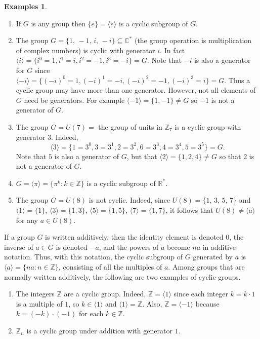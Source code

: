 \documentclass[12pt]{article}
\newcommand{\R}{\mathbb R}
\newcommand{\cm} {{\mathbb C}}
\newcommand{\Z} {{\mathbb Z}}
\newcommand{\units}[1]{\ensuremath{U(#1)}}
\newcommand{\<}{\ensuremath{\langle}}
\renewcommand{\>}{\ensuremath{\rangle}}
\newcommand{\eye}{\ensuremath{e}}
\theoremstyle{plain}
\theoremstyle{definition}
\newtheorem{exs}[thm]{Examples}
\begin{document}
\begin{exs}  \begin{enumerate}
\item If $G$ is any group  then
$\{\eye\} =\langle \eye\rangle$ is a cyclic subgroup of $G$.

\item  The group $G=\{1,\, -1,\, i,\, -i\} \subseteq \cm^*$ (the
group operation  is multiplication of complex numbers) is cyclic
with generator $i$.  In fact $\langle i\rangle = \{i^0=1, i^1=i,
i^2=-1, i^3=-i\} = G$.  Note that $-i$ is also a generator for $G$
since $\langle -i\rangle =\{(-i)^0=1, (-i)^1=-i, (-i)^2=-1,
(-i)^3=i\}=G$.  Thus a cyclic group may have more than one
generator.  However, not all elements of $G$ need be generators.
For example $\langle -1\rangle = \{1, -1\}\ne G$ so $-1$ is not a
generator of $G$.

\item The group $G=\units{7}=$ the group of units in $\Z_7$ is
a cyclic group with generator $3$.  Indeed,
$$\langle 3\rangle = \{ 1=3^0, 3=3^1, 2=3^2, 6=3^3, 4=3^4, 5=3^5\}=G.$$
Note that $5$ is also a generator of $G$, but that
$\langle 2\rangle = \{1, 2, 4\}\ne G$ so that 2 is not a generator of $G$.

\item  $G=\langle \pi\rangle =\{\pi^k:k\in \Z\}$ is a cyclic
subgroup of $\R^*$.

\item  The group $G=\units{8}$ is not cyclic.  Indeed, since
$\units{8}=\{1, \, 3,\, 5,\,7\}$ and $\langle 1\rangle = \{1\}$,
$\langle 3\rangle = \{1, 3\}$, $\langle 5\rangle=\{1, 5\}$,
$\langle 7\rangle =\{1, 7\}$, it follows that $\units{8}\ne \langle
a\rangle$ for any $a\in \units{8}$.
\end{enumerate}
\medskip
If a group $G$ is written additively, then the identity
element is denoted $0$,   the inverse of $a\in G$ is denoted $-a$,
and the powers of $a$ become $na$ in additive notation.  Thus,
with this notation, the cyclic subgroup of $G$ generated by $a$ is
$\langle a \rangle = \{na: n\in \Z\}$, consisting of all the
multiples of $a$. Among groups that are normally written
additively, the following are two examples of cyclic groups.
\begin{enumerate}
\addtocounter{enumi}{5} \item  The integers $\Z$ are a cyclic
group. Indeed, $\Z=\langle 1\rangle$ since each integer $k=k\cdot
1$ is a multiple of $1$, so $k\in \langle 1\rangle$ and $\langle
1\rangle =\Z$.  Also, $\Z=\langle -1\rangle$ because $k=(-k)\cdot
(-1)$ for each $k\in \Z$.

\item  $\Z_n$ is a cyclic group under addition with generator $1$.
\end{enumerate}
\end{exs}
\end{document}

